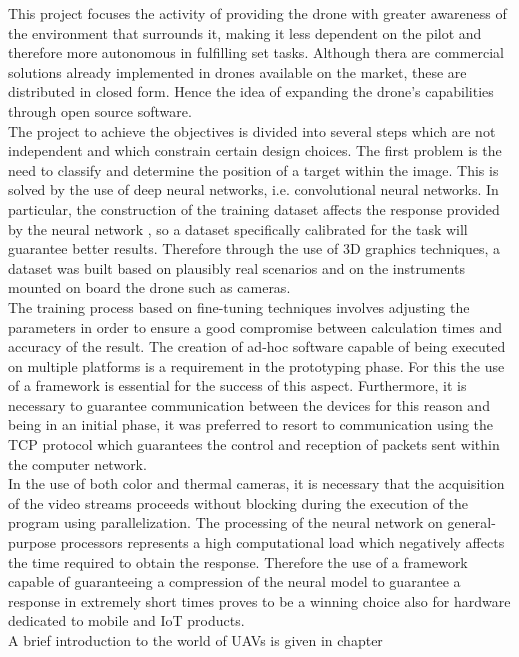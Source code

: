 \noindent This project focuses the activity of providing the drone with greater 
awareness of the environment that surrounds it, making it less dependent on the 
pilot and therefore more autonomous in fulfilling set tasks.
Although thera are commercial solutions already implemented in drones available on the 
market, these are distributed in closed form.
Hence the idea of expanding the drone's capabilities through open source 
software.\\
The project to achieve the objectives is divided into several steps which are
not independent and which constrain certain design choices. The first problem is
the need to classify and determine the position of a target within the image. 
This is solved by the use of deep neural networks, i.e. convolutional neural
networks. 
In particular, the construction of the training dataset affects the response
provided by the neural network , so a dataset specifically calibrated for the
task will guarantee better results. Therefore through the use of 3D graphics
techniques, a dataset was built based on plausibly real scenarios and on the
instruments mounted on board the drone such as cameras.\\
The training process based on fine-tuning techniques involves adjusting the
parameters in order to ensure a good compromise between calculation times and
accuracy of the result. The creation of ad-hoc software capable of being
executed on multiple platforms is a requirement in the prototyping phase. For
this the use of a framework is essential for the success of this aspect. 
Furthermore, it is necessary to guarantee communication between the devices for
this reason and being in an initial phase, it was preferred to resort to
communication using the TCP protocol which guarantees the control and reception
of packets sent within the computer network.\\ 
In the use of both color and thermal cameras, it is necessary that the
acquisition of the video streams proceeds without blocking during the execution
of the program using parallelization. 
The processing of the neural network on general-purpose processors represents a
high computational load which negatively affects the time required to obtain the
response.
Therefore the use of a framework capable of guaranteeing a
compression of the neural model to guarantee a response in extremely short times
proves to be a winning choice also for hardware dedicated to mobile and IoT
products.\\
\noindent A brief introduction to the world of UAVs is given in chapter
